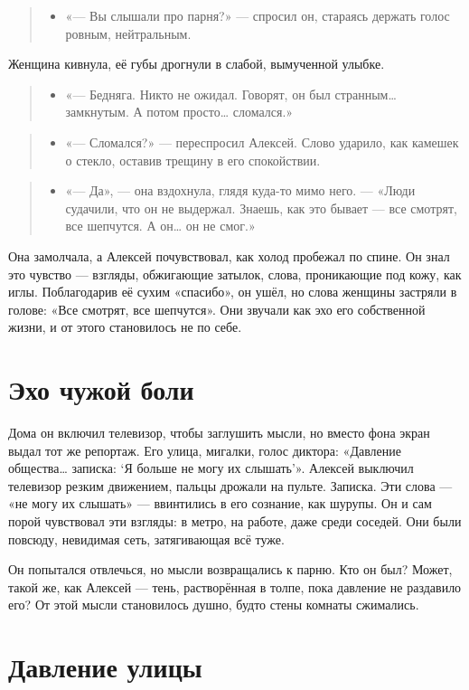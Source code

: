 \documentclass[12pt,a4paper]{book}
\newenvironment{dialogue}{\begin{quote}\itshape\begin{itemize}\item[]}{\end{itemize}\end{quote}}
\begin{document}
\begin{dialogue}
«— Вы слышали про парня?» — спросил он, стараясь держать голос ровным, нейтральным.
\end{dialogue}

Женщина кивнула, её губы дрогнули в слабой, вымученной улыбке.

\begin{dialogue}
«— Бедняга. Никто не ожидал. Говорят, он был странным… замкнутым. А потом просто… сломался.»
\end{dialogue}

\begin{dialogue}
«— Сломался?» — переспросил Алексей. Слово ударило, как камешек о стекло, оставив трещину в его спокойствии.
\end{dialogue}

\begin{dialogue}
«— Да», — она вздохнула, глядя куда-то мимо него. — «Люди судачили, что он не выдержал. Знаешь, как это бывает — все смотрят, все шепчутся. А он… он не смог.»
\end{dialogue}

Она замолчала, а Алексей почувствовал, как холод пробежал по спине. Он знал это чувство — взгляды, обжигающие затылок, слова, проникающие под кожу, как иглы. Поблагодарив её сухим «спасибо», он ушёл, но слова женщины застряли в голове: «Все смотрят, все шепчутся». Они звучали как эхо его собственной жизни, и от этого становилось не по себе.

\section{Эхо чужой боли}

Дома он включил телевизор, чтобы заглушить мысли, но вместо фона экран выдал тот же репортаж. Его улица, мигалки, голос диктора: «Давление общества… записка: ‘Я больше не могу их слышать’». Алексей выключил телевизор резким движением, пальцы дрожали на пульте. Записка. Эти слова — «не могу их слышать» — ввинтились в его сознание, как шурупы. Он и сам порой чувствовал эти взгляды: в метро, на работе, даже среди соседей. Они были повсюду, невидимая сеть, затягивающая всё туже.

Он попытался отвлечься, но мысли возвращались к парню. Кто он был? Может, такой же, как Алексей — тень, растворённая в толпе, пока давление не раздавило его? От этой мысли становилось душно, будто стены комнаты сжимались.

\section{Давление улицы}
\end{document}
